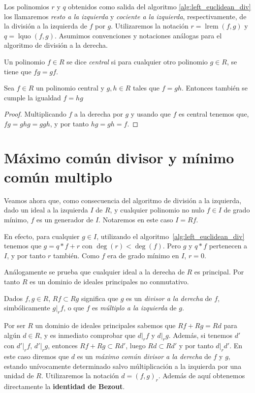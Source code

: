 Los polinomios \(r\) y \(q\) obtenidos como salida del algoritmo \ref{alg:left_euclidean_div} los llamaremos \textit{resto a la izquierda} y  \textit{cociente a la izquierda}, respectivamente, de la división a la izquierda de \(f\) por \(g\). Utilizaremos la notación \(r = \operatorname{lrem}(f,g)\) y \(q = \operatorname{lquo}(f,g)\). Asumimos convenciones y notaciones análogas para el algoritmo de división a la derecha.

Un polinomio \(f \in R\) se dice \textit{central} si para cualquier otro polinomio \(g \in R\), se tiene que \(fg = gf\).

\begin{lemma}
\label{lem:central_decomposition}
    Sea \(f \in R\) un polinomio central y \(g,h \in R\) tales que \(f = gh\). Entonces también se cumple la igualdad \(f = hg\)
\end{lemma}

\begin{proof}
    Multiplicando \(f\) a la derecha por \(g\) y usando que \(f\) es central tenemos que, \( fg = ghg = ggh\), y por tanto \(hg = gh = f.\)
\end{proof}

\section{Máximo común divisor y mínimo común multiplo}%
\label{sec:máximo_común_divisor_y_mínimo_común_multiplo}

Veamos ahora que, como consecuencia del algoritmo de división a la izquierda, dado un ideal a la izquierda \(I\) de \(R\), y cualquier polinomio no nulo  \(f \in I\) de grado mínimo, \(f\) es un generador de  \(I\). Notaremos en este caso \(I = Rf\).

En efecto, para cualquier \(g \in I\), utilizando el algoritmo~\ref{alg:left_euclidean_div} tenemos que \(g = q*f + r\) con \(\deg(r) < \deg(f)\). Pero \(g\) y \(q*f\) pertenecen a \(I\), y por tanto  \(r\) también. Como \(f\) era de grado mínimo en \(I\),  \(r = 0\).

Análogamente se prueba que cualquier ideal a la derecha de \(R\) es principal.  Por tanto \(R\) es un dominio de ideales principales no conmutativo.

Dados \(f,g \in R\), \(Rf \subset Rg\) significa que \(g\) es un \textit{divisor a la derecha} de \(f\), simbólicamente \(g|_{r} f\), o que \(f\) es \textit{múltiplo a la izquierda} de \(g\).

Por ser \(R\) un dominio de ideales principales sabemos que \(Rf + Rg = Rd\) para algún \(d \in R\), y es inmediato comprobar que \(d |_r f\) y  \(d |_r g\). Además, si tenemos \(d'\) con \(d' |_r f\), \(d' |_r g\), entonces \(Rf + Rg \subset Rd'\), luego \(Rd \subset Rd'\) y por tanto  \(d |_r d'\). En este caso diremos que \(d\) es un \textit{máximo común divisor a la derecha} de \(f\) y \(g\), estando unívocamente determinado salvo múltiplicación a la izquierda por una unidad de \(R\). Utilizaremos la notación \(d = {(f,g)}_r\). Además de aquí obtenemos directamente la \textbf{identidad de Bezout}.

